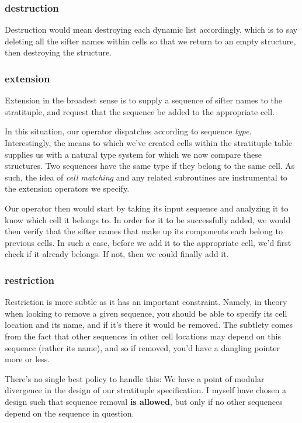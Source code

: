 \documentclass[twoside]{article}
\begin{document}
\subsubsection*{destruction}

Destruction would mean destroying each dynamic list accordingly, which is to say deleting all the sifter names
within cells so that we return to an empty structure, then destroying the structure.

\subsubsection*{extension}

Extension in the broadest sense is to supply a sequence of sifter names to the stratituple, and request that the
sequence be added to the appropriate cell.

In this situation, our operator dispatches according to sequence \emph{type}. Interestingly, the means to which
we've created cells within the stratituple table supplies us with a natural type system for which we now compare
these structures. Two sequences have the same type if they belong to the same cell. As such, the idea
of \emph{cell matching} and any related subroutines are instrumental to the extension operators we specify.

Our operator then would start by taking its input sequence and analyzing it to know which cell it belongs to.
In order for it to be successfully added, we would then verify that the sifter names that make up
its components each belong to previous cells. In such a case, before we add it to the appropriate cell,
we'd first check if it already belongs. If not, then we could finally add it.

\subsubsection*{restriction}

Restriction is more subtle as it has an important constraint. Namely, in theory when looking to remove a given sequence,
you should be able to specify its cell location and its name, and if it's there it would be removed. The subtlety
comes from the fact that other sequences in other cell locations may depend on this sequence (rather its name),
and so if removed, you'd have a dangling pointer more or less.

There's no single best policy to handle this: We have a point of modular divergence in the design of our
stratituple specification. I myself have chosen a design such that sequence removal {\bf is allowed},
but only if no other sequences depend on the sequence in question.
\end{document}
